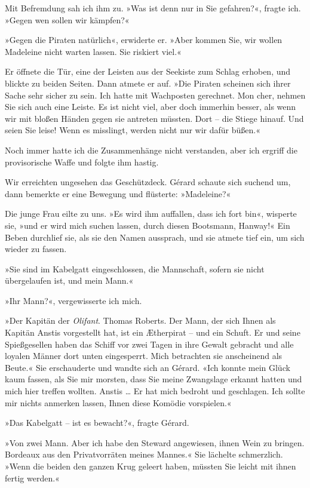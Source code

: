 Mit Befremdung sah ich ihm zu. »Was ist denn nur in Sie gefahren?«,
fragte ich. »Gegen wen sollen wir kämpfen?«

»Gegen die Piraten natürlich«, erwiderte er. »Aber kommen Sie, wir
wollen Madeleine nicht warten lassen. Sie riskiert viel.«

Er öffnete die Tür, eine der Leisten aus der Seekiste zum Schlag
erhoben, und blickte zu beiden Seiten. Dann atmete er auf. »Die
Piraten scheinen sich ihrer Sache sehr sicher zu sein. Ich hatte
mit Wachposten gerechnet. Mon cher, nehmen Sie sich auch eine
Leiste. Es ist nicht viel, aber doch immerhin besser, als wenn wir
mit bloßen Händen gegen sie antreten müssten. Dort – die Stiege
hinauf. Und seien Sie leise! Wenn es misslingt, werden nicht nur
wir dafür büßen.«

Noch immer hatte ich die Zusammenhänge nicht verstanden, aber ich
ergriff die provisorische Waffe und folgte ihm hastig.

\bigpar

Wir erreichten ungesehen das Geschützdeck. Gérard schaute sich
suchend um, dann bemerkte er eine Bewegung und flüsterte:
»Madeleine?«

Die junge Frau eilte zu uns. »Es wird ihm auffallen, dass ich fort
bin«, wisperte sie, »und er wird mich suchen lassen, durch diesen
Bootsmann, Hanway!« Ein Beben durchlief sie, als sie den Namen
aussprach, und sie atmete tief ein, um sich wieder zu fassen.

»Sie sind im Kabelgatt eingeschlossen, die Mannschaft, sofern sie
nicht übergelaufen ist, und mein Mann.«

»Ihr Mann?«, vergewisserte ich mich.

»Der Kapitän der \emph{Olifant}. Thomas Roberts. Der Mann, der sich
Ihnen als Kapitän Anstis vorgestellt hat, ist ein Ætherpirat – und
ein Schuft. Er und seine Spießgesellen haben das Schiff vor zwei
Tagen in ihre Gewalt gebracht und alle loyalen Männer dort unten
eingesperrt. Mich betrachten sie anscheinend als Beute.« Sie
erschauderte und wandte sich an Gérard. «Ich konnte mein Glück kaum
fassen, als Sie mir morsten, dass Sie meine Zwangslage erkannt
hatten und mich hier treffen wollten. Anstis \ldots{} Er hat mich
bedroht und geschlagen. Ich sollte mir nichts anmerken lassen,
Ihnen diese Komödie vorspielen.«

»Das Kabelgatt – ist es bewacht?«, fragte Gérard.

»Von zwei Mann. Aber ich habe den Steward angewiesen, ihnen Wein zu
bringen. Bordeaux aus den Privatvorräten meines Mannes.« Sie
lächelte schmerzlich. »Wenn die beiden den ganzen Krug geleert
haben, müssten Sie leicht mit ihnen fertig werden.«

